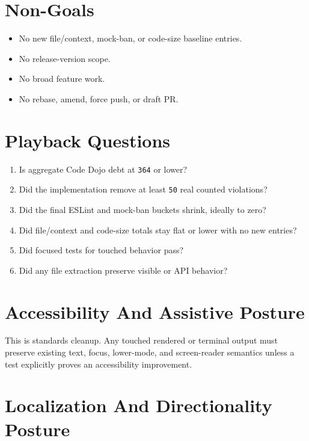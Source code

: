 \section{Non-Goals}\label{record-242-non-goals}

\begin{itemize}
\tightlist
\item
  No new file/context, mock-ban, or code-size baseline entries.
\item
  No release-version scope.
\item
  No broad feature work.
\item
  No rebase, amend, force push, or draft PR.
\end{itemize}

\section{Playback Questions}\label{record-242-playback-questions}

\begin{enumerate}
\def\labelenumi{\arabic{enumi}.}
\tightlist
\item
  Is aggregate Code Dojo debt at \texttt{3\allowbreak{}6\allowbreak{}4} or lower?
\item
  Did the implementation remove at least \texttt{5\allowbreak{}0} real counted violations?
\item
  Did the final ESLint and mock-ban buckets shrink, ideally to zero?
\item
  Did file/context and code-size totals stay flat or lower with no new entries?
\item
  Did focused tests for touched behavior pass?
\item
  Did any file extraction preserve visible or API behavior?
\end{enumerate}

\section{Accessibility And Assistive Posture}\label{record-242-accessibility-and-assistive-posture}

This is standards cleanup. Any touched rendered or terminal output must preserve existing text, focus, lower-mode, and screen-reader semantics unless a test explicitly proves an accessibility improvement.

\section{Localization And Directionality Posture}\label{record-242-localization-and-directionality-posture}


